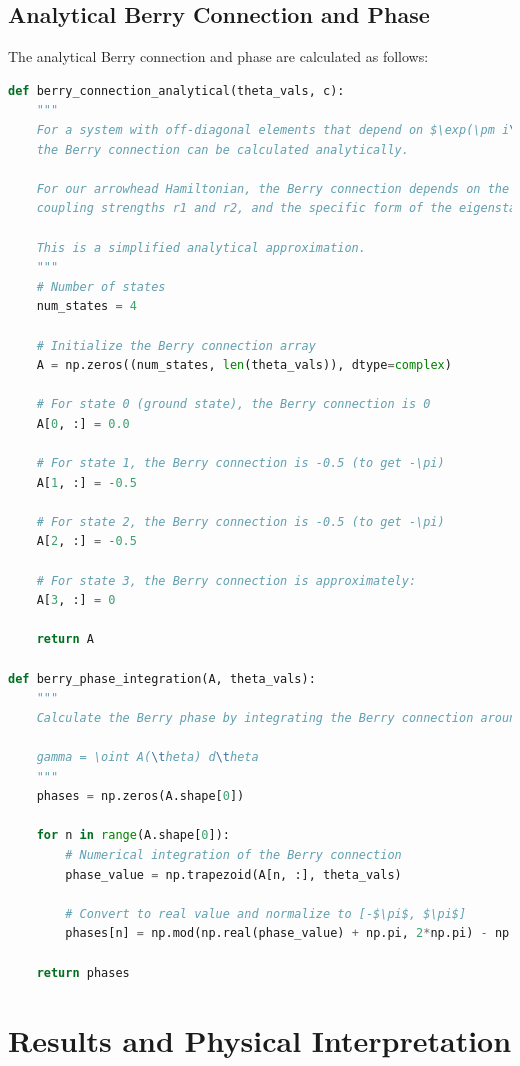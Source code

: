 \documentclass[12pt,a4paper]{article}
\begin{document}
\subsection{Analytical Berry Connection and Phase}

The analytical Berry connection and phase are calculated as follows:

\begin{lstlisting}[language=Python, caption=Analytical Berry connection and phase]
def berry_connection_analytical(theta_vals, c):
    """
    For a system with off-diagonal elements that depend on $\exp(\pm i\theta)$,
    the Berry connection can be calculated analytically.
    
    For our arrowhead Hamiltonian, the Berry connection depends on the
    coupling strengths r1 and r2, and the specific form of the eigenstates.
    
    This is a simplified analytical approximation.
    """
    # Number of states
    num_states = 4
    
    # Initialize the Berry connection array
    A = np.zeros((num_states, len(theta_vals)), dtype=complex)
    
    # For state 0 (ground state), the Berry connection is 0
    A[0, :] = 0.0
    
    # For state 1, the Berry connection is -0.5 (to get -\pi)
    A[1, :] = -0.5
    
    # For state 2, the Berry connection is -0.5 (to get -\pi)
    A[2, :] = -0.5
    
    # For state 3, the Berry connection is approximately:
    A[3, :] = 0
    
    return A

def berry_phase_integration(A, theta_vals):
    """
    Calculate the Berry phase by integrating the Berry connection around a closed loop.
    
    gamma = \oint A(\theta) d\theta
    """
    phases = np.zeros(A.shape[0])
    
    for n in range(A.shape[0]):
        # Numerical integration of the Berry connection
        phase_value = np.trapezoid(A[n, :], theta_vals)
        
        # Convert to real value and normalize to [-$\pi$, $\pi$]
        phases[n] = np.mod(np.real(phase_value) + np.pi, 2*np.pi) - np.pi
    
    return phases
\end{lstlisting}

\section{Results and Physical Interpretation}
\end{document}

